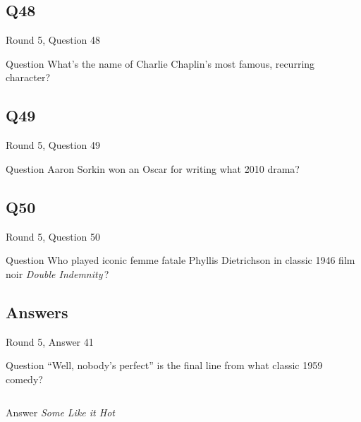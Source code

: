 \documentclass[11pt]{beamer}
\begin{document}
\subsection*{Q48}
\begin{frame}[t]{Round 5, Question 48}
\vspace{2em}
\begin{block}{Question}
What's the name of Charlie Chaplin's most famous, recurring character?
\end{block}
\end{frame}
    

\subsection*{Q49}
\begin{frame}[t]{Round 5, Question 49}
\vspace{2em}
\begin{block}{Question}
Aaron Sorkin won an Oscar for writing what 2010 drama?
\end{block}
\end{frame}
    

\subsection*{Q50}
\begin{frame}[t]{Round 5, Question 50}
\vspace{2em}
\begin{block}{Question}
Who played iconic femme fatale Phyllis Dietrichson in classic 1946 film noir \emph{Double Indemnity}\,?
\end{block}
\end{frame}
    
\subsection{Answers}

\begin{frame}[t]{Round 5, Answer 41}
\vspace{2em}
\begin{block}{Question}
``Well, nobody's perfect'' is the final line from what classic 1959 comedy?
\end{block}
\pause{}
\begin{columns}[T,totalwidth=\linewidth]
\begin{column}{0.35\linewidth}
\begin{block}{Answer}
\emph{Some Like it Hot}
\end{block}
\end{column}
\begin{column}{0.6\linewidth}
\begin{center}
\texttt{[image: \{Images/some-like-hot1]}.jpg}
\end{center}
\end{column}
\end{columns}
\end{frame}
    
\end{document}
